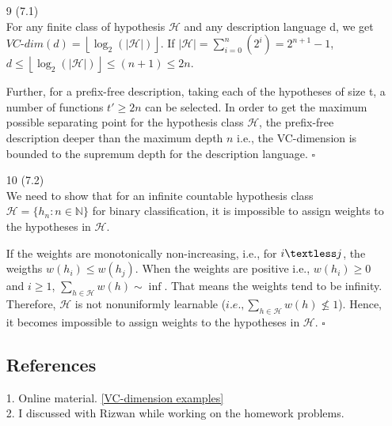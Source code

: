 \documentclass[12pt,letterpaper]{article}
\newcommand{\floor}[1]{\left\lfloor #1 \right\rfloor}
\begin{document}
\begin{enumerate}
\vspace{8pt}


\item[9] (7.1)\\
For any finite class of hypothesis $\mathcal{H}$ and any description language d, we get $VC\text{-}dim(d) = \floor{\log_2(|\mathcal{H}|)}$. 
If $|\mathcal{H}| = \sum_{i=0}^n(2^i) = 2^{n+1} - 1$,
$d \leq \floor{\log_2(|\mathcal{H}|)} \leq (n+1) \leq 2n$.

Further, for a prefix-free description, taking each of the hypotheses of size t, a number of functions $t' \ge 2n$ can be selected. In order to get the maximum possible separating point for the hypothesis class $\mathcal{H}$, the prefix-free description deeper than the maximum depth $n$ i.e., the VC-dimension is bounded to the supremum depth for the description language. $\square$


\item[10] (7.2) \\
We need to show that for an infinite countable hypothesis class $\mathcal{H} = \{h_n : n \in \mathbb{N}\}$ for binary classification, it is impossible to assign weights to the hypotheses in $\mathcal{H}$.

If the weights are monotonically non-increasing, i.e., for $i \textless j$, the weigths $w(h_i) \leq w(h_j)$. When the weights are positive i.e., $w(h_i) \ge 0$ and $i \ge 1$, $\sum_{h\in\mathcal{H}} w(h) \sim \inf$. That means the weights tend to be infinity. Therefore, $\mathcal{H}$ is not nonuniformly learnable ($i.e., \sum_{h\in \mathcal{H}} w(h) \nleq 1$). Hence, it becomes impossible to assign weights to the hypotheses in $\mathcal{H}$. $\square$




\subsection*{References}
1. Online material. \href{http://www.cs.uu.nl/docs/vakken/mbd/slides/VC-Examples.pdf}{[VC-dimension examples]} \\
2. I discussed with Rizwan while working on the homework problems.




\end{enumerate}
	
\end{document}
